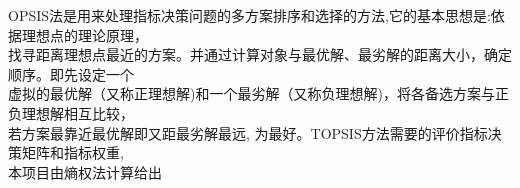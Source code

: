 \documentclass[preview]{standalone}
\begin{document}
\begin{center}
OPSIS法是用来处理指标决策问题的多方案排序和选择的方法,它的基本思想是:依据理想点的理论原理，\\找寻距离理想点最近的方案。并通过计算对象与最优解、最劣解的距离大小，确定顺序。即先设定一个\\ 虚拟的最优解（又称正理想解)和一个最劣解（又称负理想解)，将各备选方案与正负理想解相互比较，\\若方案最靠近最优解即又距最劣解最远, 为最好。TOPSIS方法需要的评价指标决策矩阵和指标权重,\\本项目由熵权法计算给出
\end{center}
\end{document}
